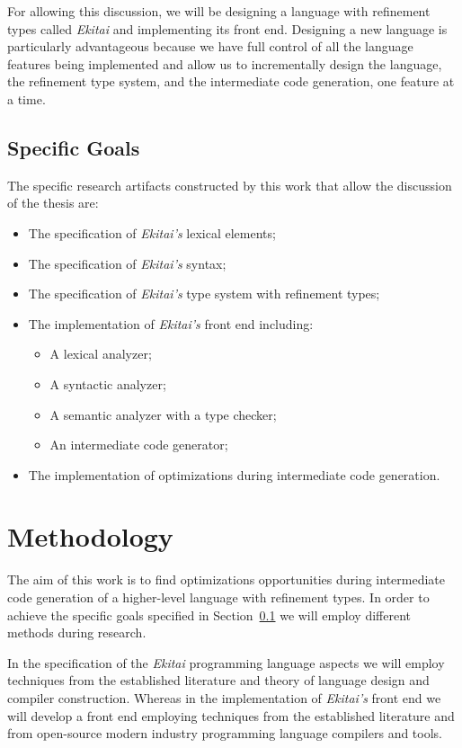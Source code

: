 \documentclass[
    oneside,
    english,
    embeddedlogo,
    noabntexcite
]{ufsc-thesis-rn46-2019}
\begin{document}
For allowing this discussion, we will be designing a language with refinement types called \textit{Ekitai} and implementing its front end.
Designing a new language is particularly advantageous because we have full control of all the language features being implemented and allow us to incrementally design the language, the refinement type system, and the intermediate code generation, one feature at a time.

\subsection{Specific Goals}\label{chapter:introduction:sec:goals:specific_goals}
The specific research artifacts constructed by this work that allow the discussion of the thesis are:
\begin{itemize}
    \item The specification of \textit{Ekitai's} lexical elements;
    \item The specification of \textit{Ekitai's} syntax;
    \item The specification of \textit{Ekitai's} type system with refinement types;
    \item The implementation of \textit{Ekitai's} front end including:
          \begin{itemize}
              \item A lexical analyzer;
              \item A syntactic analyzer;
              \item A semantic analyzer with a type checker;
              \item An intermediate code generator;
          \end{itemize}
    \item The implementation of optimizations during intermediate code generation.
\end{itemize}

\section{Methodology}

The aim of this work is to find optimizations opportunities during intermediate code generation of a higher-level language with refinement types.
In order to achieve the specific goals specified in Section~\ref{chapter:introduction:sec:goals:specific_goals} we will employ different methods during research.

In the specification of the \textit{Ekitai} programming language aspects we will employ techniques from the established literature and theory of language design and compiler construction.
Whereas in the implementation of \textit{Ekitai's} front end we will develop a front end employing techniques from the established literature and from open-source modern industry programming language compilers and tools.
\end{document}
